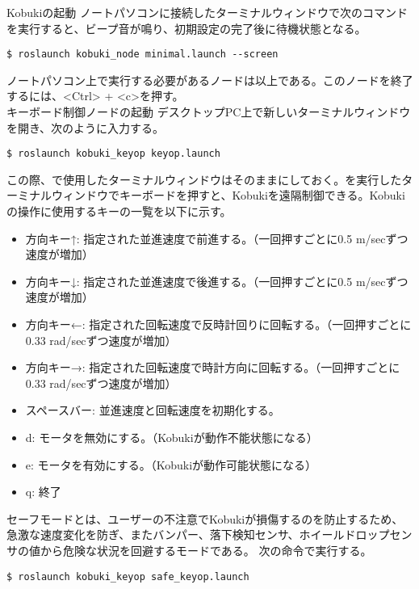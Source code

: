 \circled{\thenum} Kobukiの起動
ノートパソコンに接続したターミナルウィンドウで次のコマンドを実行すると、ビープ音が鳴り、初期設定の完了後に待機状態となる。

\begin{lstlisting}[language=ROS]
$ roslaunch kobuki_node minimal.launch --screen
\end{lstlisting}

ノートパソコン上で実行する必要があるノードは以上である。このノードを終了  するには、<Ctrl> + <c>を押す。\\

\circled{\thenum} キーボード制御ノードの起動
デスクトップPC上で新しいターミナルウィンドウを開き、次のように入力する。

\begin{lstlisting}[language=ROS]
$ roslaunch kobuki_keyop keyop.launch
\end{lstlisting}

この際、で使用したターミナルウィンドウはそのままにしておく。を実行したターミナルウィンドウでキーボードを押すと、Kobukiを遠隔制御できる。Kobukiの操作に使用するキーの一覧を以下に示す。


\begin{itemize}
\item 方向キー↑: 指定された並進速度で前進する。（一回押すごとに0.5 m/secずつ速度が増加）
\item 方向キー↓: 指定された並進速度で後進する。（一回押すごとに0.5 m/secずつ速度が増加）
\item 方向キー←: 指定された回転速度で反時計回りに回転する。（一回押すごとに0.33 rad/secずつ速度が増加）
\item 方向キー→: 指定された回転速度で時計方向に回転する。（一回押すごとに0.33 rad/secずつ速度が増加）
\item スペースバー: 並進速度と回転速度を初期化する。
\item d: モータを無効にする。（Kobukiが動作不能状態になる）
\item e: モータを有効にする。（Kobukiが動作可能状態になる）
\item q: 終了
\end{itemize}

\begin{exercise}
セーフモードとは、ユーザーの不注意でKobukiが損傷するのを防止するため、急激な速度変化を防ぎ、またバンパー、落下検知センサ、ホイールドロップセンサの値から危険な状況を回避するモードである。  次の命令で実行する。

\begin{lstlisting}[language=ROS]
$ roslaunch kobuki_keyop safe_keyop.launch
\end{lstlisting}

\end{exercise}

